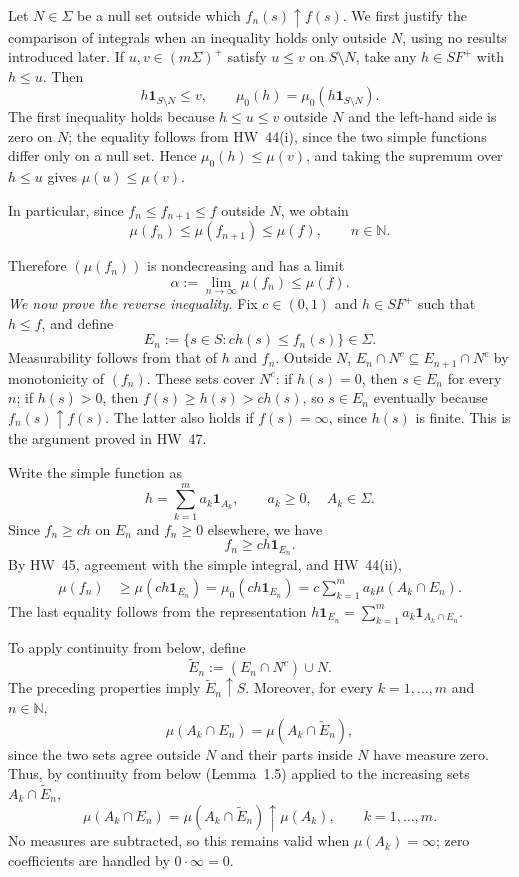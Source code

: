 \documentclass[11pt,a4paper]{article}
\newcommand{\studyheading}[1]{{\color{StudyBlue}\normalfont\bfseries\boldmath #1}}
\begin{document}
\par\noindent\studyheading{Expanded Proof.}\par\nobreak
\par
Let $N\in\Sigma$ be a null set outside which $f_n(s)\uparrow f(s)$. We first justify the comparison of integrals when an inequality holds only outside $N$, using no results introduced later. If $u,v\in(m\Sigma)^+$ satisfy $u\le v$ on $S\setminus N$, take any $h\in SF^+$ with $h\le u$. Then
\[
 h\mathbf1_{S\setminus N}\le v,
 \qquad \mu_0(h)=\mu_0(h\mathbf1_{S\setminus N}).
\]
The first inequality holds because $h\le u\le v$ outside $N$ and the left-hand side is zero on $N$; the equality follows from HW~44(i), since the two simple functions differ only on a null set. Hence $\mu_0(h)\le\mu(v)$, and taking the supremum over $h\le u$ gives $\mu(u)\le\mu(v)$.

In particular, since $f_n\le f_{n+1}\le f$ outside $N$, we obtain
\[
 \mu(f_n)\le\mu(f_{n+1})\le\mu(f),\qquad n\in\mathbb N.
\]

Therefore $(\mu(f_n))$ is nondecreasing and has a limit
\[
 \alpha:=\lim_{n\to\infty}\mu(f_n)\le\mu(f).
\]
\textit{We now prove the reverse inequality.} Fix $c\in(0,1)$ and $h\in SF^+$ such that $h\le f$, and define
\[
 E_n:=\{s\in S:ch(s)\le f_n(s)\}\in\Sigma.
\]
Measurability follows from that of $h$ and $f_n$. Outside $N$,
$E_n\cap N^c\subseteq E_{n+1}\cap N^c$ by monotonicity of $(f_n)$.
These sets cover $N^c$: if $h(s)=0$, then $s\in E_n$ for every $n$;
if $h(s)>0$, then $f(s)\ge h(s)>ch(s)$, so $s\in E_n$ eventually
because $f_n(s)\uparrow f(s)$. The latter also holds if $f(s)=\infty$,
since $h(s)$ is finite. This is the argument proved in HW~47.

Write the simple function as
\[
 h=\sum_{k=1}^{m}a_k\mathbf1_{A_k},\qquad a_k\ge0,\quad A_k\in\Sigma.
\]
Since $f_n\ge ch$ on $E_n$ and $f_n\ge0$ elsewhere, we have
\[
 f_n\ge ch\mathbf1_{E_n}.
\]
By HW~45, agreement with the simple integral, and HW~44(ii),
\[
\begin{aligned}
\mu(f_n)
 &\ge\mu(ch\mathbf1_{E_n}) =\mu_0(ch\mathbf1_{E_n}) =c\sum_{k=1}^{m}a_k\mu(A_k\cap E_n).
\end{aligned}
\]
The last equality follows from the representation $h\mathbf1_{E_n}=\sum_{k=1}^{m}a_k\mathbf1_{A_k\cap E_n}$.

To apply continuity from below, define
\[
 \widetilde E_n:=(E_n\cap N^c)\cup N.
\]
The preceding properties imply $\widetilde E_n\uparrow S$. Moreover,
for every $k=1,\ldots,m$ and $n\in\mathbb N$,
\[
 \mu(A_k\cap E_n)=\mu(A_k\cap\widetilde E_n),
\]
since the two sets agree outside $N$ and their parts inside $N$
have measure zero. Thus, by continuity from below (Lemma~1.5)
applied to the increasing sets $A_k\cap\widetilde E_n$,
\[
 \mu(A_k\cap E_n)=\mu(A_k\cap\widetilde E_n)
 \uparrow\mu(A_k),\qquad k=1,\ldots,m.
\]
No measures are subtracted, so this remains valid when
$\mu(A_k)=\infty$; zero coefficients are handled by $0\cdot\infty=0$.
\end{document}
